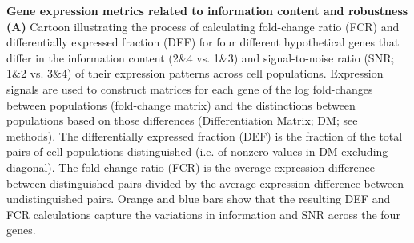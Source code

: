 \textbf{Gene expression metrics related to information content and robustness} \textbf{(A)} Cartoon illustrating the process of calculating fold-change ratio (FCR) and differentially expressed fraction (DEF) for four different hypothetical genes that differ in the information content (2\&4 vs. 1\&3) and signal-to-noise ratio (SNR; 1\&2 vs. 3\&4) of their expression patterns across cell populations. Expression signals are used to construct matrices for each gene of the log fold-changes between populations (fold-change matrix) and the distinctions between populations based on those differences (Differentiation Matrix; DM; see methods). The differentially expressed fraction (DEF) is the fraction of the total pairs of cell populations distinguished (i.e. of nonzero values in DM excluding diagonal). The fold-change ratio (FCR) is the average expression difference between distinguished pairs divided by the average expression difference between undistinguished pairs. Orange and blue bars show that the resulting DEF and FCR calculations capture the variations in information and SNR across the four genes.